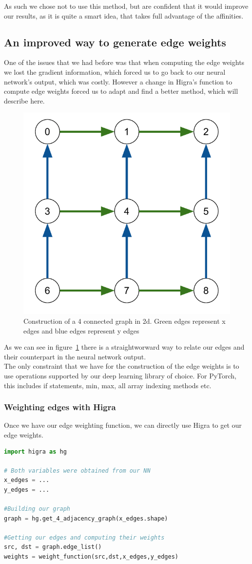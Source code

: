 As such we chose not to use this method, but are confident that it would
improve our results, as it is quite a smart idea, that takes full advantage of
the affinities.




\subsection{An improved way to generate edge weights}

One of the issues that we had before was that when computing the edge weights we lost the gradient
information, which forced us to go back to our neural network's output, which was costly.
However a change in Higra's function to compute edge weights forced us to adapt and find a better
method, which will describe here.\\

\begin{figure}[!htbp]
	\centering
	\includegraphics[width=0.4\linewidth]{./images/graph.pdf}
	\caption{Construction of a 4 connected graph in 2d. Green edges represent x
	edges and blue edges represent y edges}%
	\label{fig:graph}
\end{figure}

As we can see in figure~\ref{fig:graph} there is a straightworward way to
relate our edges and their counterpart in the neural network output.\\

The only constraint that we have for the construction of the edge weights is to
use operations supported by our deep learning library of choice. For PyTorch, this
includes if statements, min, max, all array indexing methods etc.

\subsubsection{Weighting edges with Higra}

Once we have our edge weighting function, we can directly use Higra to get our
edge weights.
\begin{lstlisting}[language=Python]
import higra as hg

# Both variables were obtained from our NN
x_edges = ...
y_edges = ...

#Building our graph
graph = hg.get_4_adjacency_graph(x_edges.shape)

#Getting our edges and computing their weights
src, dst = graph.edge_list()
weights = weight_function(src,dst,x_edges,y_edges)
\end{lstlisting}

